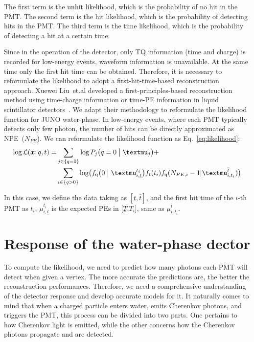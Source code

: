 The first term is the unhit likelihood, which is the probability of no hit in the PMT. The second term is the hit likelihood, which is the probability of detecting hits in the PMT. The third term is the time likelihood, which is the probability of detecting a hit at a certain time.

Since in the operation of the detector, only TQ information (time and charge) is recorded for low-energy events, waveform information is unavailable. At the same time only the first hit time can be obtained. Therefore, it is necessary to reformulate the likelihood to adopt a first-hit-time-based reconstruction approach. Xuewei Liu~et.al developed a first-principles-based reconstruction method using time-charge information or time-PE information in liquid scintillator detectors~\cite{Liu:2024cxo}. We adapt their methodology to reformulate the likelihood function for JUNO water-phase. In low-energy events, where each PMT typically detects only few photon, the number of hits can be directly approximated as NPE~($N_{PE}$). We can reformulate the likelihood function as Eq.~\eqref{eq:likelihood}:
\begin{equation}
	\begin{aligned}
		\log \mathcal{L}(\boldsymbol{x};{q},{t})= & \sum_{j \in \{q=0\}}\log P_j \bigl( q=0\bigm| \mu_j \bigr)+                                                                                                                        \\
		                                          & \sum_{i \in \{q>0\}} \log \bigl( f_{\mathrm{q}}\bigl( 0 \bigm| \mu_{i,\underline{t}}^{t_i} \bigr)f_{\mathrm{t}}(t_i)f_{\mathrm{q}}(N_{PE,i}-1|\mu_{i,t_{i}}^{\overline{t}}) \bigr)
	\end{aligned}
	\label{eq:likelihood}
\end{equation}

In this case, we define the data taking as $[\underline{t} ,\overline{t} ]$, and the first hit time of the $i$-th PMT as $t_{i}$, $\mu_{i,\underline{t}}^{t_i}$ is the expected PEs in [$\underline{T}$,${T_i}$], same as $\mu_{i,t_{i}}^{\overline{t}}$.

\section{Response of the water-phase dector}
To compute the likelihood, we need to predict how many photons each PMT will detect when given a vertex. The more accurate the predictions are, the better the reconstruction performances. Therefore, we need a comprehensive understanding of the detector response and develop accurate models for it.
It naturally comes to mind that when a charged particle enters water, emits Cherenkov photons, and triggers the PMT, this process can be divided into two parts. One pertains to how Cherenkov light is emitted, while the other concerns how the Cherenkov photons propagate and are detected.

